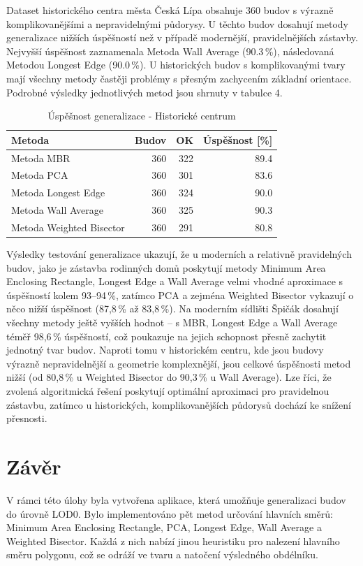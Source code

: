 \documentclass[a4paper,12pt]{article}
\begin{document}
Dataset historického centra města Česká Lípa obsahuje 360 budov s výrazně komplikovanějšími a nepravidelnými půdorysy. U těchto budov dosahují metody generalizace nižších úspěšností než v případě modernější, pravidelnějších zástavby. Nejvyšší úspěšnost zaznamenala Metoda Wall Average (90.3\,\%), následovaná Metodou Longest Edge (90.0\,\%). U historických budov s komplikovanými tvary mají všechny metody častěji problémy s přesným zachycením základní orientace. Podrobné výsledky jednotlivých metod jsou shrnuty v tabulce 4.

\begin{table}[H]
\centering
\begin{tabular}{lrrr}
\hline
\textbf{Metoda} & \textbf{Budov} & \textbf{OK} & \textbf{Úspěšnost [\%]} \\
\hline
Metoda MBR            & 360 & 322 & 89.4 \\
Metoda PCA            & 360 & 301 & 83.6 \\
Metoda Longest Edge   & 360 & 324 & 90.0 \\
Metoda Wall Average   & 360 & 325 & 90.3 \\
Metoda Weighted Bisector & 360 & 291 & 80.8 \\
\hline
\end{tabular}
\caption{Úspěšnost generalizace - Historické centrum}
\label{tab:generalization_historic_center}
\end{table}

Výsledky testování generalizace ukazují, že u moderních a relativně pravidelných budov, jako je zástavba rodinných domů poskytují metody Minimum Area Enclosing Rectangle, Longest Edge a Wall Average velmi vhodné aproximace s úspěšností kolem 93–94\,\%, zatímco PCA a zejména Weighted Bisector vykazují o něco nižší úspěšnost (87,8\,\% až 83,8\,\%). Na moderním sídlišti Špičák dosahují všechny metody ještě vyšších hodnot – s MBR, Longest Edge a Wall Average téměř 98,6\,\% úspěšností, což poukazuje na jejich schopnost přesně zachytit jednotný tvar budov. Naproti tomu v historickém centru, kde jsou budovy výrazně nepravidelnější a geometrie komplexnější, jsou celkové úspěšnosti metod nižší (od 80,8\,\% u Weighted Bisector do 90,3\,\% u Wall Average). Lze říci, že zvolená algoritmická řešení poskytují optimální aproximaci pro pravidelnou zástavbu, zatímco u historických, komplikovanějších půdorysů dochází ke snížení přesnosti.

\section{Závěr}
V rámci této úlohy byla vytvořena aplikace, která umožňuje generalizaci budov do úrovně LOD0. Bylo implementováno pět metod určování hlavních směrů: Minimum Area Enclosing Rectangle, PCA, Longest Edge, Wall Average a Weighted Bisector. Každá z nich nabízí jinou heuristiku pro nalezení hlavního směru polygonu, což se odráží ve tvaru a natočení výsledného obdélníku.
\end{document}
